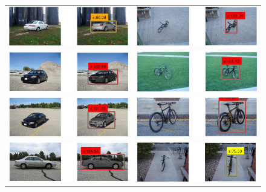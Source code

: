 \documentclass[10pt,twocolumn,letterpaper]{article}
\begin{document}
\begin{figure}[h]
\setlength\tabcolsep{1pt}
\centering
\begin{tabular}{|c|c|}
  \hline
  \includegraphics[width=0.40\linewidth]{supp/car32.png} &
  \includegraphics[width=0.40\linewidth]{supp/bicycle17.png} \\
  \includegraphics[width=0.40\linewidth]{supp/car26.png} &
  \includegraphics[width=0.40\linewidth]{supp/bicycle18.png} \\
  \includegraphics[width=0.40\linewidth]{supp/car29.png} & 
  \includegraphics[width=0.40\linewidth]{supp/bicycle13.png} \\
  \includegraphics[width=0.40\linewidth]{supp/car10.png} &
  \includegraphics[width=0.40\linewidth]{supp/bicycle9.png} \\

\end{tabular}
\end{figure}
\end{document}
